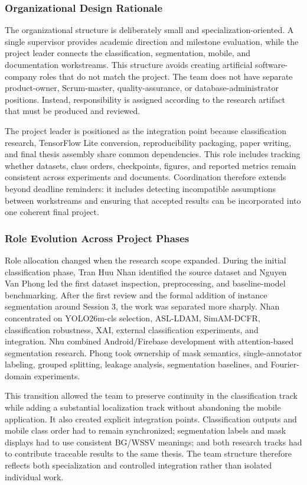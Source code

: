 \documentclass[12pt,a4paper]{report}
\begin{document}
\subsubsection{Organizational Design Rationale}
The organizational structure is deliberately small and specialization-oriented. A single supervisor provides academic direction and milestone evaluation, while the project leader connects the classification, segmentation, mobile, and documentation workstreams. This structure avoids creating artificial software-company roles that do not match the project. The team does not have separate product-owner, Scrum-master, quality-assurance, or database-administrator positions. Instead, responsibility is assigned according to the research artifact that must be produced and reviewed.\par
The project leader is positioned as the integration point because classification research, TensorFlow Lite conversion, reproducibility packaging, paper writing, and final thesis assembly share common dependencies. This role includes tracking whether datasets, class orders, checkpoints, figures, and reported metrics remain consistent across experiments and documents. Coordination therefore extends beyond deadline reminders: it includes detecting incompatible assumptions between workstreams and ensuring that accepted results can be incorporated into one coherent final project.\par
\subsubsection{Role Evolution Across Project Phases}
Role allocation changed when the research scope expanded. During the initial classification phase, Tran Huu Nhan identified the source dataset and Nguyen Van Phong led the first dataset inspection, preprocessing, and baseline-model benchmarking. After the first review and the formal addition of instance segmentation around Session 3, the work was separated more sharply. Nhan concentrated on YOLO26m-cls selection, ASL-LDAM, SimAM-DCFR, classification robustness, XAI, external classification experiments, and integration. Nhu combined Android/Firebase development with attention-based segmentation research. Phong took ownership of mask semantics, single-annotator labeling, grouped splitting, leakage analysis, segmentation baselines, and Fourier-domain experiments.\par
This transition allowed the team to preserve continuity in the classification track while adding a substantial localization track without abandoning the mobile application. It also created explicit integration points. Classification outputs and mobile class order had to remain synchronized; segmentation labels and mask displays had to use consistent BG/WSSV meanings; and both research tracks had to contribute traceable results to the same thesis. The team structure therefore reflects both specialization and controlled integration rather than isolated individual work.\par
\end{document}
